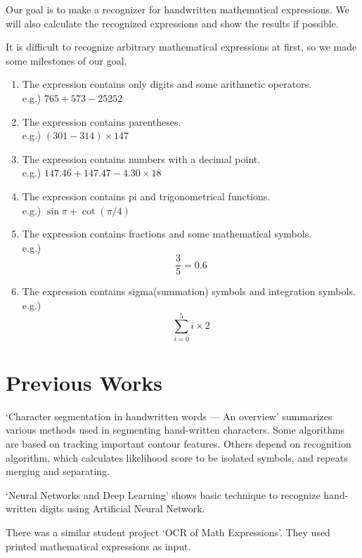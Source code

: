 \documentclass[10pt,twocolumn,letterpaper]{article}
\begin{document}
Our goal is to make a recognizer for handwritten mathematical expressions. We will also calculate the recognized expressions and show the results if possible.

It is difficult to recognize arbitrary mathematical expressions at first, so we made some milestones of our goal.

\begin{enumerate}
\item The expression contains only digits and some arithmetic operators. \\
e.g.) $765+573-25252$

\item The expression contains parentheses. \\
e.g.) $(301-314)\times 147$

\item The expression contains numbers with a decimal point. \\
e.g.) $147.46 + 147.47 - 4.30 \times 18$

\item The expression contains pi and trigonometrical functions. \\
e.g.) $\sin \pi + \cot (\pi / 4)$

\item The expression contains fractions and some mathematical symbols. \\
e.g.) $$ \frac{3}{5} = 0.6 $$

\item The expression contains sigma(summation) symbols and integration symbols. \\
e.g.) $$ \sum_{i=0}^{5} i \times 2 $$

\end{enumerate}

\section{Previous Works}
`Character segmentation in handwritten words — An overview'
\cite{Lu199677} summarizes various methods used in segmenting hand-written characters.
Some algorithms are based on tracking important contour features.
Others depend on recognition algorithm,
which calculates likelihood score to be isolated symbols,
and repeats merging and separating.

`Neural Networks and Deep Learning' \cite{MichaelNielsen} shows basic technique to recognize hand-written digits using Artificial Neural Network.

There was a similar student project `OCR of Math Expressions'\cite{OCRMATH}.
They used printed mathematical expressions as input.
\end{document}
